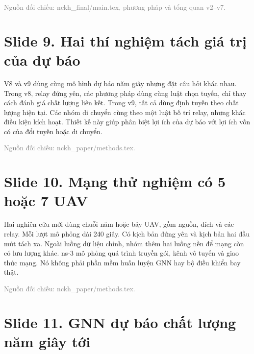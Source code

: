 {\small\textcolor{gray}{Nguồn đối chiếu: nckh\_final/main.tex, phương pháp và tổng quan v2–v7.}}




\section*{Slide 9. Hai thí nghiệm tách giá trị của dự báo}


V8 và v9 dùng cùng mô hình dự báo năm giây nhưng đặt câu hỏi khác nhau. Trong v8, relay đứng yên, các phương pháp dùng cùng luật chọn tuyến, chỉ thay cách đánh giá chất lượng liên kết. Trong v9, tất cả dùng định tuyến theo chất lượng hiện tại. Các nhóm di chuyển cùng theo một luật bố trí relay, nhưng khác điều kiện kích hoạt. Thiết kế này giúp phân biệt lợi ích của dự báo với lợi ích vốn có của đổi tuyến hoặc di chuyển.

{\small\textcolor{gray}{Nguồn đối chiếu: nckh\_paper/methods.tex.}}




\section*{Slide 10. Mạng thử nghiệm có 5 hoặc 7 UAV}


Hai nghiên cứu mới dùng chuỗi năm hoặc bảy UAV, gồm nguồn, đích và các relay. Mỗi lượt mô phỏng dài 240 giây. Có kịch bản đứng yên và kịch bản hai đầu mút tách xa. Ngoài luồng dữ liệu chính, nhóm thêm hai luồng nền để mạng còn có lưu lượng khác. ns-3 mô phỏng quá trình truyền gói, kênh vô tuyến và giao thức mạng. Nó không phải phần mềm huấn luyện GNN hay bộ điều khiển bay thật.

{\small\textcolor{gray}{Nguồn đối chiếu: nckh\_paper/methods.tex.}}




\section*{Slide 11. GNN dự báo chất lượng năm giây tới}


